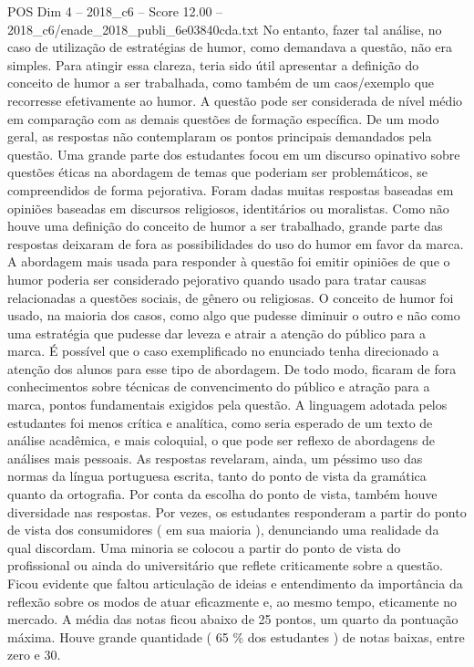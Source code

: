 \begin{textsample}{POS Dim 4 – 2018\_c6 – Score 12.00 – 2018\_c6/enade\_2018\_publi\_6e03840cda.txt}
No entanto, fazer tal análise, no caso de utilização de estratégias de humor, como demandava a questão, não era simples.
Para atingir essa clareza, teria sido útil apresentar a definição do conceito de humor a ser trabalhada, como também de um caos/exemplo que recorresse efetivamente ao humor.
A questão pode ser considerada de nível médio em comparação com as demais questões de formação específica.
De um modo geral, as respostas não contemplaram os pontos principais demandados pela questão.
Uma grande parte dos estudantes focou em um discurso opinativo sobre questões éticas na abordagem de temas que poderiam ser problemáticos, se compreendidos de forma pejorativa.
Foram dadas muitas respostas baseadas em opiniões baseadas em discursos religiosos, identitários ou moralistas.
Como não houve uma definição do conceito de humor a ser trabalhado, grande parte das respostas deixaram de fora as possibilidades do uso do humor em favor da marca.
A abordagem mais usada para responder à questão foi emitir opiniões de que o humor poderia ser considerado pejorativo quando usado para tratar causas relacionadas a questões sociais, de gênero ou religiosas.
O conceito de humor foi usado, na maioria dos casos, como algo que pudesse diminuir o outro e não como uma estratégia que pudesse dar leveza e atrair a atenção do público para a marca.
É possível que o caso exemplificado no enunciado tenha direcionado a atenção dos alunos para esse tipo de abordagem.
De todo modo, ficaram de fora conhecimentos sobre técnicas de convencimento do público e atração para a marca, pontos fundamentais exigidos pela questão.
A linguagem adotada pelos estudantes foi menos crítica e analítica, como seria esperado de um texto de análise acadêmica, e mais coloquial, o que pode ser reflexo de abordagens de análises mais pessoais.
As respostas revelaram, ainda, um péssimo uso das normas da língua portuguesa escrita, tanto do ponto de vista da gramática quanto da ortografia.
Por conta da escolha do ponto de vista, também houve diversidade nas respostas.
Por vezes, os estudantes responderam a partir do ponto de vista dos consumidores ( em sua maioria ), denunciando uma realidade da qual discordam.
Uma minoria se colocou a partir do ponto de vista do profissional ou ainda do universitário que reflete criticamente sobre a questão.
Ficou evidente que faltou articulação de ideias e entendimento da importância da reflexão sobre os modos de atuar eficazmente e, ao mesmo tempo, eticamente no mercado.
A média das notas ficou abaixo de 25 pontos, um quarto da pontuação máxima.
Houve grande quantidade ( 65 \% dos estudantes ) de notas baixas, entre zero e 30.

\end{textsample}
